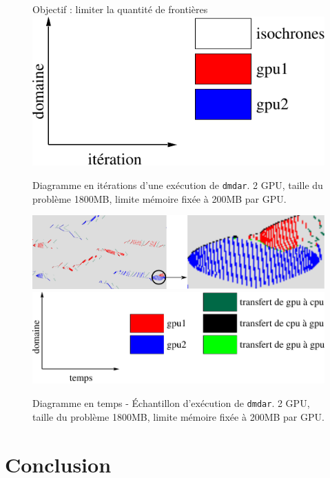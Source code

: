 \documentclass[9pt]{beamer}
\begin{document}
\begin{frame}
\begin{figure}
\begin{minipage}{0.3\textwidth}
    \end{minipage} \hfill
    \begin{minipage}{0.65\textwidth}
      Objectif : limiter la quantité de frontières \vfill
      \includegraphics[width=0.55\linewidth]{img/xpm-legend-iter-gpu2.pdf}
    \end{minipage} \hfill
    \caption{%
      \label{fig:dmdar-iter-gpu2}%
      Diagramme en itérations d'une exécution de \texttt{dmdar}. 2 GPU, taille
      du problème 1800MB, limite mémoire fixée à 200MB par GPU.}
  \end{figure}
\end{frame}

\begin{frame}
  \begin{figure}
    \centering
    \vfill
    \includegraphics[width=1\linewidth]{img/dmdar-gpu2.pdf}
    \newline
    \vfill
    \includegraphics[width=0.6\linewidth]{img/xpm-legend-gpu2.pdf}
    \vfill
    \caption{%
      \label{fig:dmdar-gpu2}%
      Diagramme en temps - Échantillon d'exécution de \texttt{dmdar}. 2 GPU,
      taille du problème 1800MB, limite mémoire fixée à 200MB par GPU.}
  \end{figure}
  \vfill
\end{frame}

\section{Conclusion}
\end{document}

